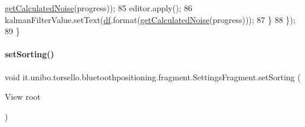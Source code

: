 \begin{DoxyCode}
      \hyperlink{classit_1_1unibo_1_1torsello_1_1bluetoothpositioning_1_1fragment_1_1SettingsFragment_a595d859602f34ca81957a0578c1602a6_a595d859602f34ca81957a0578c1602a6}{getCalculatedNoise}(progress));
85                 editor.apply();
86                 kalmanFilterValue.setText(\hyperlink{classit_1_1unibo_1_1torsello_1_1bluetoothpositioning_1_1fragment_1_1SettingsFragment_af6b80a700dc80c39a56d001b68a47694_af6b80a700dc80c39a56d001b68a47694}{df}.format(\hyperlink{classit_1_1unibo_1_1torsello_1_1bluetoothpositioning_1_1fragment_1_1SettingsFragment_a595d859602f34ca81957a0578c1602a6_a595d859602f34ca81957a0578c1602a6}{getCalculatedNoise}(progress)));
87             \}
88         \});
89     \}
\end{DoxyCode}
\hypertarget{classit_1_1unibo_1_1torsello_1_1bluetoothpositioning_1_1fragment_1_1SettingsFragment_ae29f0b3d6fc60f1ceeab5dcc530166c1_ae29f0b3d6fc60f1ceeab5dcc530166c1}{}\label{classit_1_1unibo_1_1torsello_1_1bluetoothpositioning_1_1fragment_1_1SettingsFragment_ae29f0b3d6fc60f1ceeab5dcc530166c1_ae29f0b3d6fc60f1ceeab5dcc530166c1} 
\paragraph{\texorpdfstring{set\+Sorting()}{setSorting()}}
{\footnotesize\ttfamily void it.\+unibo.\+torsello.\+bluetoothpositioning.\+fragment.\+Settings\+Fragment.\+set\+Sorting (\begin{DoxyParamCaption}\item[{View}]{root }\end{DoxyParamCaption})\hspace{0.3cm}{\ttfamily [private]}}


